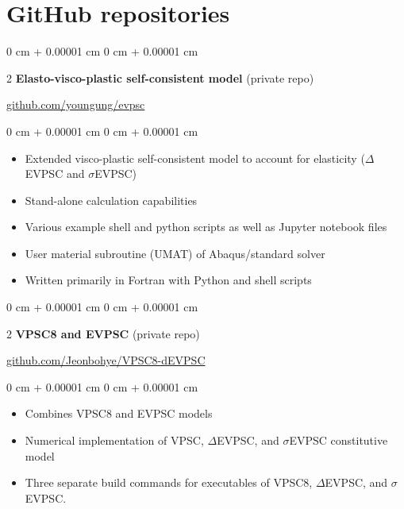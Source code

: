 \documentclass[10pt, letterpaper]{article}
\newenvironment{highlights}{
    \begin{itemize}[
        topsep=0.10 cm,
        parsep=0.10 cm,
        partopsep=0pt,
        itemsep=0pt,
        leftmargin=0 cm + 10pt
    ]
}{
    \end{itemize}
} %
\newenvironment{onecolentry}{
    \begin{adjustwidth}{
        0 cm + 0.00001 cm
    }{
        0 cm + 0.00001 cm
    }
}{
    \end{adjustwidth}
} %
\newenvironment{twocolentry}[2][]{
    \onecolentry
    \def\secondColumn{#2}
    \setcolumnwidth{\fill, 4.5 cm}
    \begin{paracol}{2}
}{
    \switchcolumn \raggedleft \secondColumn
    \end{paracol}
    \endonecolentry
} %
\begin{document}
    \section{GitHub repositories}
        \begin{twocolentry}{\href{https://github.com/youngung/evpsc}{github.com/youngung/evpsc}}\textbf{Elasto-visco-plastic self-consistent model} (private repo)
        \end{twocolentry}
        \vspace{0.10 cm}
        \begin{onecolentry}
            \begin{highlights}
                \item Extended visco-plastic self-consistent model to account for elasticity ($\Delta$EVPSC and $\sigma$EVPSC)
                \item Stand-alone calculation capabilities
                \item Various example shell and python scripts as well as Jupyter notebook files
                \item User material subroutine (UMAT) of Abaqus/standard solver
                \item Written primarily in Fortran with Python and shell scripts
            \end{highlights}
        \end{onecolentry}
        \vspace{0.4 cm}

        \begin{twocolentry}{\href{https://github.com/Jeonbohye/VPSC8-dEVPSC}{github.com/Jeonbohye/VPSC8-dEVPSC}}\textbf{VPSC8 and EVPSC} (private repo)
        \end{twocolentry}
        \begin{onecolentry}
            \begin{highlights}
                \item Combines VPSC8 and EVPSC models
                \item Numerical implementation of VPSC, $\Delta$EVPSC, and $\sigma$EVPSC constitutive model
                \item Three separate build commands for executables of VPSC8, $\Delta$EVPSC, and $\sigma$EVPSC.
            \end{highlights}
        \end{onecolentry}
\end{document}
